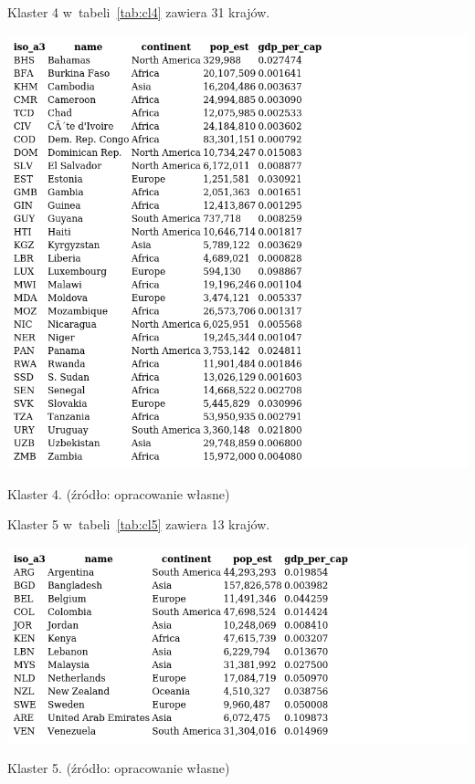 \documentclass[11pt]{report}
\begin{document}
    Klaster 4 w~tabeli~\ref{tab:cl4} zawiera 31 krajów.
    \begin{table}[!htp]
        \centering
        \includegraphics[width=\linewidth]{tables/CLUST/clust4kmeans.png}
        \caption{Klaster 4. (źródło: opracowanie własne)}
        \label{tab:cl4}
    \end{table}

    Klaster 5 w~tabeli~\ref{tab:cl5} zawiera 13 krajów.
    \begin{table}[!htp]
        \centering
        \includegraphics[width=\linewidth]{tables/CLUST/clust5kmeans.png}
        \caption{Klaster 5. (źródło: opracowanie własne)}
        \label{tab:cl5}
    \end{table}
\end{document}
